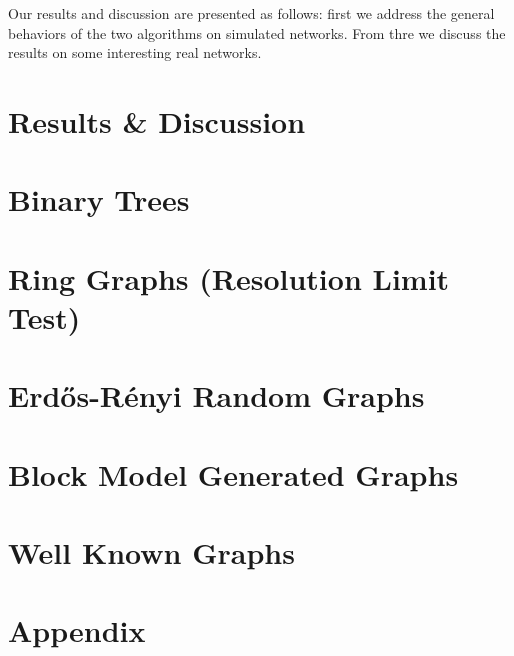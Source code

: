 \documentclass[twocolumn,twoside]{IEEEtran}
\begin{document}
Our results and discussion are presented as follows: first we address the
general behaviors of the two algorithms on simulated networks. From thre we
discuss the results on some interesting real networks.

\section*{Results \& Discussion}\label{sec:RD}



%
% 
%
%
%   

\newcommand{\inputsamepage}[1] {
    \begin{minipage}{\linewidth}
        
    \end{minipage}
}


\break
\section*{Binary Trees}


\break
\section*{Ring Graphs (Resolution Limit Test)}


\break
\section*{Erd\H{o}s-R\'{e}nyi Random Graphs}


\section*{Block Model Generated Graphs}


\section*{Well Known Graphs}



\onecolumn
\section{Appendix}
 

\twocolumn
{}

\end{document}
